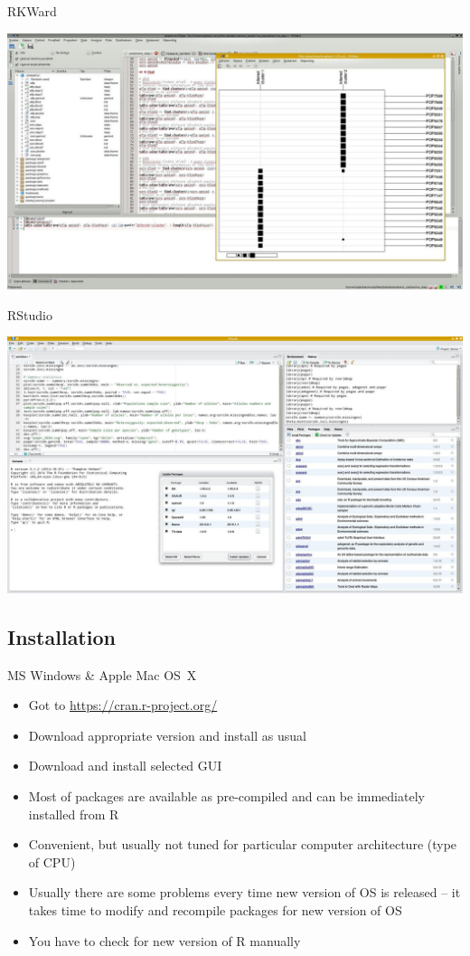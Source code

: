 \documentclass[compress, ucs, xelatex, 11pt, xcolor=svgnames,
  hyperref={
    bookmarks=true,
    unicode=true,
    colorlinks=true,
    pdftitle={Molecular data in R},
    plainpages=false,
    pdfauthor={Vojtech Zeisek},
    pdfsubject={Course about phylogeny and evolution in R},
    pdfcreator={XeLaTeX},
    pdfkeywords={R, evolution, phylogeny, molecular data},
    linkcolor=Tomato,
    anchorcolor=SaddleBrown,
    citecolor=Goldenrod,
    filecolor=DarkMagenta,
    menucolor=Sienna,
    urlcolor=DarkTurquoise,
    pdftex},
  url={hyphens, lowtilde} %
  ]{beamer}
\begin{document}
\begin{frame}{RKWard}
\begin{center}
  \includegraphics[width=\textwidth]{rkward.jpg}
\end{center}
\end{frame}

\begin{frame}{RStudio}
\begin{center}
  \includegraphics[width=\textwidth]{rstudio.jpg}
\end{center}
\end{frame}

\subsection{Installation}

\begin{frame}{MS Windows \& Apple Mac OS~X}
\begin{itemize}
 \item Got to \url{https://cran.r-project.org/}
 \item Download appropriate version and install as usual
 \item Download and install selected GUI
 \item Most of packages are available as pre-compiled and can be immediately installed from R
 \item Convenient, but usually not tuned for particular computer architecture (type of CPU)
 \item Usually there are some problems every time new version of OS is released -- it takes time to modify and recompile packages for new version of OS
 \item You have to check for new version of R manually
\end{itemize}
\end{frame}
\end{document}
